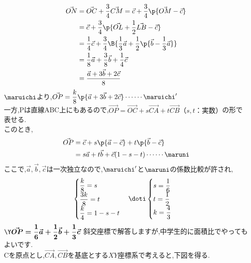 \documentclass[10pt,fleqn,a4paper]{jsarticle}
\newcommand{\ans}[1]{\mbox{\boldmath{$#1$}}}
\begin{document}
\begin{align*}
  \Vec{ON}&=\Vec{OC}+\dfrac34\Vec{CM}=\vec{c}+\dfrac34\p{\Vec{OM}-\vec{c}}\\
  &=\vec{c}+\dfrac34\p{\Vec{OL}+\dfrac12\Vec{LB}-\vec{c}}\\
  &=\dfrac{1}{4}\vec{c}+\dfrac{3}{4}\B{\dfrac13\vec{a}+\dfrac12\p{\vec{b}-\dfrac13\vec{a}}}\\
  &=\dfrac18\vec{a}+\dfrac38\vec{b}+\dfrac14\vec{c}\\
  &=\dfrac{\vec{a}+3\vec{b}+2\vec{c}}{8}
\end{align*}
$\maruichi$より,$\Vec{OP}=\dfrac{k}{8}\p{\vec{a}+3\vec{b}+2\vec{c}}\cdots\cdots\maruichi^\prime$\\
一方,Pは直線ABC上にもあるので,$\Vec{OP}=\Vec{OC}+s\Vec{CA}+t\Vec{CB}（s,t：実数）$の形で表せる.\\
このとき,
\begin{align*}
  \Vec{OP}&=\vec{c}+s\p{\vec{a}-\vec{c}}+t\p{\vec{b}-\vec{c}}\\
  &=s\vec{a}+t\vec{b}+\vec{c}(1-s-t)\cdots\cdots\maruni
\end{align*}
ここで,$\vec{a},\vec{b},\vec{c}$は一次独立なので,$\maruichi^\prime$と$\maruni$の係数比較が許され,
\begin{align*}
  \begin{cases}
  \dfrac{k}{8}=s\\
  \dfrac{3k}{8}=t\\
  \dfrac{k}{4}=1-s-t
  \end{cases}\doti\begin{cases}
    s=\dfrac16\\
    t=\dfrac12\\
    k=\dfrac43
  \end{cases}
\end{align*}
$\Y\ans{\Vec{OP}=\dfrac16\vec{a}+\dfrac12\vec{b}+\dfrac13\vec{c}}$
\newpage
\noindent\kakkonib\chu 斜交座標で解答しますが,中学生的に面積比でやってもよいです.\\
Cを原点とし,$\Vec{CA},\Vec{CB}$を基底とする$XY$座標系で考えると,下図を得る.
\begin{center}
\end{center}
\end{document}
